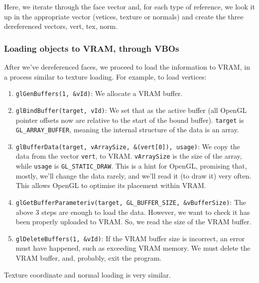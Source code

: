 \documentclass{scrartcl}
\begin{document}
Here, we iterate through the face vector and, for each type of reference, we look it up in the appropriate vector (vetices, texture or normals) and create the three dereferenced vectors, vert, tex, norm.

\subsubsection{Loading objects to VRAM, through VBOs}

After we've dereferenced faces, we proceed to load the information to VRAM, in a process similar to texture loading. For example, to load vertices:

\begin{enumerate}
\item \lstinline{glGenBuffers(1, &vId)}: We allocate a VRAM buffer.
\item \lstinline{glBindBuffer(target, vId)}: We set that as the active buffer (all OpenGL pointer offsets now are relative to the start of the bound buffer). \lstinline{target} is \lstinline{GL_ARRAY_BUFFER}, meaning the internal structure of the data is an array.
\item \lstinline{glBufferData(target, vArraySize, &(vert[0]), usage)}: We copy the data from the vector \lstinline{vert}, to VRAM. \lstinline{vArraySize} is the size of the array, while \lstinline{usage} is \lstinline{GL_STATIC_DRAW}. This is a hint for OpenGL, promising that, mostly, we'll change the data rarely, and we'll read it (to draw it) very often. This allows OpenGL to optimise its placement within VRAM.
\item \lstinline{glGetBufferParameteriv(target, GL_BUFFER_SIZE, &vBufferSize)}: The above $3$ steps are enough to load the data. However, we want to check it has been properly uploaded to VRAM. So, we read the size of the VRAM buffer.
\item \lstinline{glDeleteBuffers(1, &vId)}: If the VRAM buffer size is incorrect, an error must have happened, such as exceeding VRAM memory. We must delete the VRAM buffer, and, probably, exit the program.
\end{enumerate}

Texture coordinate and normal loading is very similar.
\end{document}
